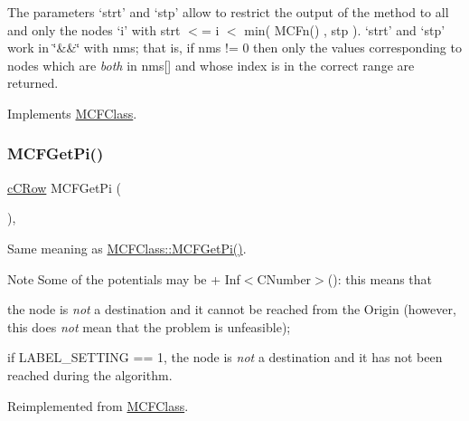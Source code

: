 The parameters `strt' and `stp' allow to restrict the output of the method to all and only the nodes `i' with strt $<$= i $<$ min( M\+C\+Fn() , stp ). `strt' and `stp' work in \char`\"{}\&\&\char`\"{} with nms; that is, if nms != 0 then only the values corresponding to nodes which are {\itshape both} in nms\mbox{[}\mbox{]} and whose index is in the correct range are returned. 

Implements \mbox{\hyperlink{class_m_c_f_class_a8c573c04800332c86ea31aeb80bbd7b1}{M\+C\+F\+Class}}.

\mbox{\label{class_s_p_tree_a2eb8e4b396fb6d82d56dcb9b7fbe871b}} 
\subsubsection{\texorpdfstring{M\+C\+F\+Get\+Pi()}{MCFGetPi()}\hspace{0.1cm}{\footnotesize\ttfamily [2/2]}}
{\footnotesize\ttfamily \mbox{\hyperlink{class_m_c_f_class_ab700102e9ba8bb6015be6818d4e99097}{c\+C\+Row}} M\+C\+F\+Get\+Pi (\begin{DoxyParamCaption}\item[{void}]{ }\end{DoxyParamCaption})\hspace{0.3cm}{\ttfamily [override]}, {\ttfamily [virtual]}}

Same meaning as \mbox{\hyperlink{class_m_c_f_class_a8f1a95d5c707f83ffc6aecba1e7e0e10}{M\+C\+F\+Class\+::\+M\+C\+F\+Get\+Pi()}}.

\begin{DoxyNote}{Note}
Some of the potentials may be + Inf$<$\+C\+Number$>$()\+: this means that
\end{DoxyNote}

\begin{DoxyItemize}
\item the node is {\itshape not} a destination and it cannot be reached from the Origin (however, this does {\itshape not} mean that the problem is unfeasible);
\item if L\+A\+B\+E\+L\+\_\+\+S\+E\+T\+T\+I\+NG == 1, the node is {\itshape not} a destination and it has not been reached during the algorithm. 
\end{DoxyItemize}

Reimplemented from \mbox{\hyperlink{class_m_c_f_class_a8f1a95d5c707f83ffc6aecba1e7e0e10}{M\+C\+F\+Class}}.

